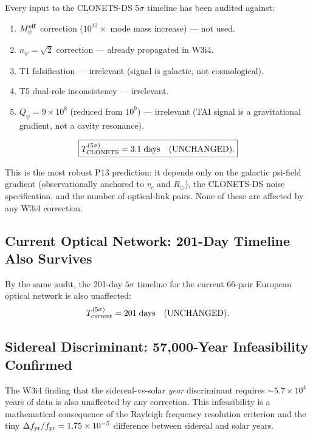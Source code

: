 \documentclass[aps,prd,twocolumn,superscriptaddress,nofootinbib]{revtex4-2}
\newcommand{\Qpsi}{Q_\psi}
\newcommand{\npsi}{n_\psi}
\newcommand{\Meff}{M_\psi^{\rm eff}}
\newcommand{\ee}[1]{\times 10^{#1}}
\begin{document}
\begin{resultbox}[title={CLONETS-DS 3.1-Day Detection SURVIVES All Corrections}]
Every input to the CLONETS-DS $5\sigma$ timeline has been audited against:
\begin{enumerate}
\item $\Meff$ correction ($10^{12}\times$ mode mass increase) --- not used.
\item $\npsi = \sqrt{2}$ correction --- already propagated in W3i4.
\item T1 falsification --- irrelevant (signal is galactic, not cosmological).
\item T5 dual-role inconsistency --- irrelevant.
\item $\Qpsi = 9\ee{8}$ (reduced from $10^9$) --- irrelevant (TAI signal
  is a gravitational gradient, not a cavity resonance).
\end{enumerate}

\begin{equation}
\boxed{T_{\rm CLONETS}^{(5\sigma)} = 3.1\;\text{days}
\quad\text{(UNCHANGED).}}
\end{equation}

This is the most robust P13 prediction: it depends only on the
galactic psi-field gradient (observationally anchored to $v_c$ and
$R_\odot$), the CLONETS-DS noise specification, and the number of
optical-link pairs. None of these are affected by any W3i4 correction.
\end{resultbox}

\subsection{Current Optical Network: 201-Day Timeline Also Survives}

By the same audit, the 201-day $5\sigma$ timeline for the current
66-pair European optical network is also unaffected:
\begin{equation}
T_{\rm current}^{(5\sigma)} = 201\;\text{days}\quad\text{(UNCHANGED)}.
\end{equation}

\subsection{Sidereal Discriminant: 57,000-Year Infeasibility Confirmed}

The W3i4 finding that the sidereal-vs-solar \emph{year} discriminant
requires $\sim 5.7\ee{4}$ years of data is also unaffected by any
correction. This infeasibility is a mathematical consequence of the
Rayleigh frequency resolution criterion and the tiny
$\Delta f_{\rm yr}/f_{\rm yr} = 1.75\ee{-5}$ difference between
sidereal and solar years.
\end{document}
